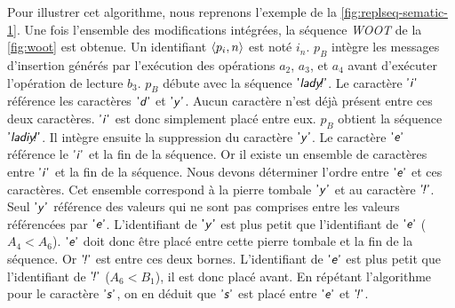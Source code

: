 Pour illustrer cet algorithme, nous reprenons l'exemple de la \autoref{fig:replseq-sematic-1}.
Une fois l'ensemble des modifications intégrées, la séquence \emph{WOOT} de la \autoref{fig:woot} est obtenue.
Un identifiant $\tuple*{p_i, n}$ est noté $i_n$.
$p_B$ intègre les messages d'insertion générés par l'exécution des opérations $a_2$, $a_3$, et $a_4$ avant d'exécuter l'opération de lecture $b_3$.
$p_B$ débute avec la séquence $\textsf{'\textit{lady\negthinspace!}'}$.
Le caractère $\textsf{'\textit{i}'}$ référence les caractères $\textsf{'\textit{d}'}$ et $\textsf{'\textit{y}'}$.
Aucun caractère n'est déjà présent entre ces deux caractères.
$\textsf{'\textit{i}'}$ est donc simplement placé entre eux.
$p_B$ obtient la séquence $\textsf{'\textit{ladiy\negthinspace!}'}$.
Il intègre ensuite la suppression du caractère $\textsf{'\textit{y}'}$.
Le caractère $\textsf{'\textit{e}'}$ référence le $\textsf{'\textit{i}'}$ et la fin de la séquence.
Or il existe un ensemble de caractères entre $\textsf{'\textit{i}'}$ et la fin de la séquence.
Nous devons déterminer l'ordre entre $\textsf{'\textit{e}'}$ et ces caractères.
Cet ensemble correspond à la pierre tombale $\textsf{'\textit{y}'}$ et au caractère $\textsf{'\textit{\negthinspace!}'}$.
Seul $\textsf{'\textit{y}'}$ référence des valeurs qui ne sont pas comprises entre les valeurs référencées par $\textsf{'\textit{e}'}$.
L'identifiant de $\textsf{'\textit{y}'}$ est plus petit que l'identifiant de $\textsf{'\textit{e}'}$ ($A_4 < A_6$).
$\textsf{'\textit{e}'}$ doit donc être placé entre cette pierre tombale et la fin de la séquence.
Or $\textsf{'\textit{\negthinspace!}'}$ est entre ces deux bornes.
L'identifiant de $\textsf{'\textit{e}'}$ est plus petit que l'identifiant de $\textsf{'\textit{\negthinspace!}'}$ ($A_6 < B_1$), il est donc placé avant.
En répétant l'algorithme pour le caractère $\textsf{'\textit{s}'}$, on en déduit que $\textsf{'\textit{s}'}$ est placé entre $\textsf{'\textit{e}'}$ et $\textsf{'\textit{\negthinspace!}'}$.


